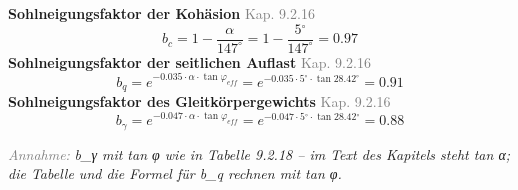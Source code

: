 \documentclass[11pt,a4paper]{article}
\newcommand{\normref}[1]{{\small\textcolor{gray}{#1}}}
\newcommand{\hinweis}[2]{\par\noindent\textcolor{gray}{\textit{#1:}} \textit{#2}\par}
\begin{document}
\noindent\textbf{Sohlneigungsfaktor der Kohäsion} \hfill \normref{Kap. 9.2.16}
\begin{equation*}
b_c = 1 - \frac{\alpha}{147^\circ} = 1 - \frac{5{}^{\circ}}{147^\circ} = 0.97
\end{equation*}
\noindent\textbf{Sohlneigungsfaktor der seitlichen Auflast} \hfill \normref{Kap. 9.2.16}
\begin{equation*}
b_q = e^{-0.035 \cdot \alpha \cdot \tan \varphi_{eff}} = e^{-0.035 \cdot 5{}^{\circ} \cdot \tan 28.42{}^{\circ}} = 0.91
\end{equation*}
\noindent\textbf{Sohlneigungsfaktor des Gleitkörpergewichts} \hfill \normref{Kap. 9.2.16}
\begin{equation*}
b_{\gamma} = e^{-0.047 \cdot \alpha \cdot \tan \varphi_{eff}} = e^{-0.047 \cdot 5{}^{\circ} \cdot \tan 28.42{}^{\circ}} = 0.88
\end{equation*}
\hinweis{Annahme}{b\_γ mit tan φ wie in Tabelle 9.2.18 -- im Text des Kapitels steht tan α; die Tabelle und die Formel für b\_q rechnen mit tan φ.}
\end{document}
